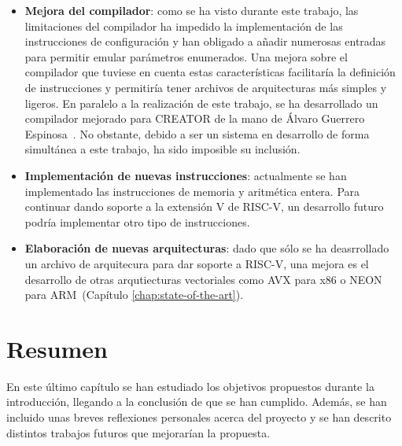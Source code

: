 \begin{itemize}
    \item \textbf{Mejora del compilador}: como se ha visto durante este trabajo, las limitaciones del compilador ha impedido la implementación de las instrucciones de configuración y han obligado a añadir numerosas entradas para permitir emular parámetros enumerados. Una mejora sobre el compilador que tuviese en cuenta estas características facilitaría la definición de instrucciones y permitiría tener archivos de arquitecturas más simples y ligeros. En paralelo a la realización de este trabajo, se ha desarrollado un compilador mejorado para CREATOR de la mano de Álvaro Guerrero Espinosa~\cite{creatorcompiler}. No obstante, debido a ser un sistema en desarrollo de forma simultánea a este trabajo, ha sido imposible su inclusión.

    \item\textbf{Implementación de nuevas instrucciones}: actualmente se han implementado las instrucciones de memoria y aritmética entera. Para continuar dando soporte a la extensión V de RISC-V, un desarrollo futuro podría implementar otro tipo de instrucciones.

    \item\textbf{Elaboración de nuevas arquitecturas}: dado que sólo se ha deasrrollado un archivo de arquitecura para dar soporte a RISC-V, una mejora es el desarrollo de otras arqutiecturas vectoriales como AVX para x86 o NEON para ARM~(Capítulo \ref{chap:state-of-the-art}).

\end{itemize}

\section{Resumen}

En este último capítulo se han estudiado los objetivos propuestos durante la introducción, llegando a la conclusión de que se han cumplido. Además, se han incluido unas breves reflexiones personales acerca del proyecto y se han descrito distintos trabajos futuros que mejorarían la propuesta.
